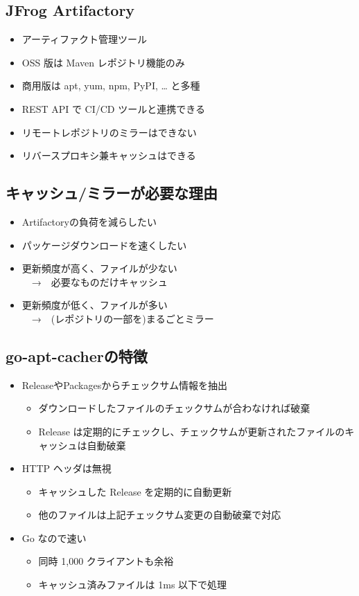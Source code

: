 \documentclass[mingoth,a4paper]{jsarticle}
\begin{document}
\subsection{JFrog Artifactory}
\begin{itemize}
 \item アーティファクト管理ツール
 \item OSS 版は Maven レポジトリ機能のみ
 \item 商用版は apt, yum, npm, PyPI, … と多種
 \item REST API で CI/CD ツールと連携できる
 \item リモートレポジトリのミラーはできない
 \item リバースプロキシ兼キャッシュはできる
\end{itemize}

\subsection{キャッシュ/ミラーが必要な理由}
\begin{itemize}
 \item Artifactoryの負荷を減らしたい
 \item パッケージダウンロードを速くしたい
\end{itemize}

\begin{itemize}
 \item 更新頻度が高く、ファイルが少ない\mbox{}\\
　→　必要なものだけキャッシュ
 \item 更新頻度が低く、ファイルが多い\mbox{}\\
　→　(レポジトリの一部を)まるごとミラー
\end{itemize}

\subsection{go-apt-cacherの特徴}
\begin{itemize}
 \item ReleaseやPackagesからチェックサム情報を抽出
\begin{itemize}
 \item ダウンロードしたファイルのチェックサムが合わなければ破棄
 \item Release は定期的にチェックし、チェックサムが更新されたファイルのキャッシュは自動破棄
\end{itemize}
 \item HTTP ヘッダは無視
\begin{itemize}
 \item キャッシュした Release を定期的に自動更新
 \item 他のファイルは上記チェックサム変更の自動破棄で対応
\end{itemize}
 \item Go なので速い
\begin{itemize}
 \item 同時 1,000 クライアントも余裕
 \item キャッシュ済みファイルは 1ms 以下で処理
\end{itemize}
\end{itemize}
\end{document}
